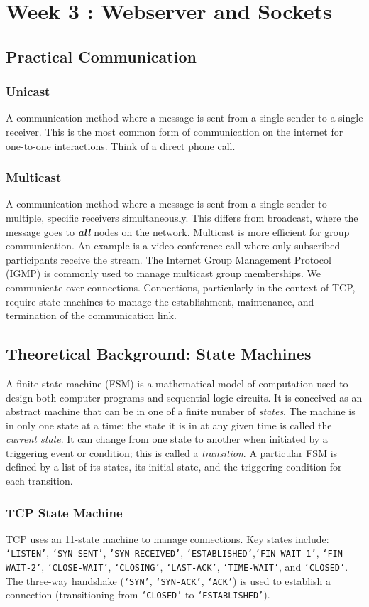\section{Week 3 : Webserver and Sockets}
\label{sec:week3}
\subsection{Practical Communication}
\subsubsection{Unicast }
A communication method where a message is sent from a single sender to a single receiver.  This is the most common form of communication on the internet for one-to-one interactions.  Think of a direct phone call.

\subsubsection{Multicast}
A communication method where a message is sent from a single sender to multiple, specific receivers simultaneously.  This differs from broadcast, where the message goes to \textbf{\textit{all}} nodes on the network. Multicast is more efficient for group communication.  An example is a video conference call where only subscribed participants receive the stream.  The Internet Group Management Protocol (IGMP) is commonly used to manage multicast group memberships.
We communicate over connections.  Connections, particularly in the context of TCP, require state machines to manage the establishment, maintenance, and termination of the communication link.

\subsection{Theoretical Background: State Machines}
A finite-state machine (FSM) is a mathematical model of computation used to design both computer programs and sequential logic circuits. It is conceived as an abstract machine that can be in one of a finite number of \textit{states}. The machine is in only one state at a time; the state it is in at any given time is called the \textit{current state}. It can change from one state to another when initiated by a triggering event or condition; this is called a \textit{transition}.  A particular FSM is defined by a list of its states, its initial state, and the triggering condition for each transition.

\subsubsection{TCP State Machine} 
TCP uses an 11-state machine to manage connections. Key states include: \texttt{`LISTEN'}, \texttt{`SYN-SENT'}, \texttt{'SYN-RECEIVED'}, \texttt{`ESTABLISHED'},\texttt{`FIN-WAIT-1'}, \texttt{`FIN-WAIT-2'}, \texttt{`CLOSE-WAIT'}, \texttt{`CLOSING'}, \texttt{`LAST-ACK'}, \texttt{`TIME-WAIT'}, and \texttt{`CLOSED'}. The three-way handshake (\texttt{`SYN'}, \texttt{`SYN-ACK'}, \texttt{`ACK'}) is used to establish a connection (transitioning from \texttt{`CLOSED'} to \texttt{`ESTABLISHED'}).

